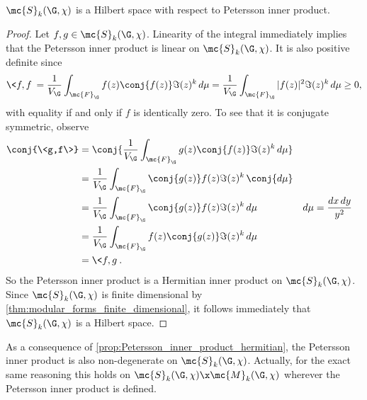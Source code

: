     \begin{proposition}\label{prop:Petersson_inner_product_hermitian}
      $\mc{S}_{k}(\G,\chi)$ is a Hilbert space with respect to Petersson inner product.
    \end{proposition}
    \begin{proof}
      Let $f,g \in \mc{S}_{k}(\G,\chi)$. Linearity of the integral immediately implies that the Petersson inner product is linear on $\mc{S}_{k}(\G,\chi)$. It is also positive definite since
      \[
        \<f,f\> = \frac{1}{V_{\G}}\int_{\mc{F}_{\G}}f(z)\conj{f(z)}\Im(z)^{k}\,d\mu = \frac{1}{V_{\G}}\int_{\mc{F}_{\G}}|f(z)|^{2}\Im(z)^{k}\,d\mu \ge 0,
      \]
      with equality if and only if $f$ is identically zero. To see that it is conjugate symmetric, observe
      \begin{align*}
        \conj{\<g,f\>} &= \conj{\frac{1}{V_{\G}}\int_{\mc{F}_{\G}}g(z)\conj{f(z)}\Im(z)^{k}\,d\mu} \\
        &= \frac{1}{V_{\G}}\int_{\mc{F}_{\G}}\conj{g(z)}f(z)\Im(z)^{k}\,\conj{d\mu} \\
        &= \frac{1}{V_{\G}}\int_{\mc{F}_{\G}}\conj{g(z)}f(z)\Im(z)^{k}\,d\mu && \text{$d\mu = \frac{dx\,dy}{y^{2}}$} \\
        &= \frac{1}{V_{\G}}\int_{\mc{F}_{\G}}f(z)\conj{g(z)}\Im(z)^{k}\,d\mu \\
        &= \<f,g\>.
      \end{align*}
      So the Petersson inner product is a Hermitian inner product on $\mc{S}_{k}(\G,\chi)$. Since $\mc{S}_{k}(\G,\chi)$ is finite dimensional by \cref{thm:modular_forms_finite_dimensional}, it follows immediately that $\mc{S}_{k}(\G,\chi)$ is a Hilbert space.
    \end{proof}

    \begin{remark}\label{rem:non-degeneracy_of_Petersson_inner_product}
      As a consequence of \cref{prop:Petersson_inner_product_hermitian}, the Petersson inner product is also non-degenerate on $\mc{S}_{k}(\G,\chi)$. Actually, for the exact same reasoning this holds on $\mc{S}_{k}(\G,\chi) \x \mc{M}_{k}(\G,\chi)$ wherever the Petersson inner product is defined.
    \end{remark}


